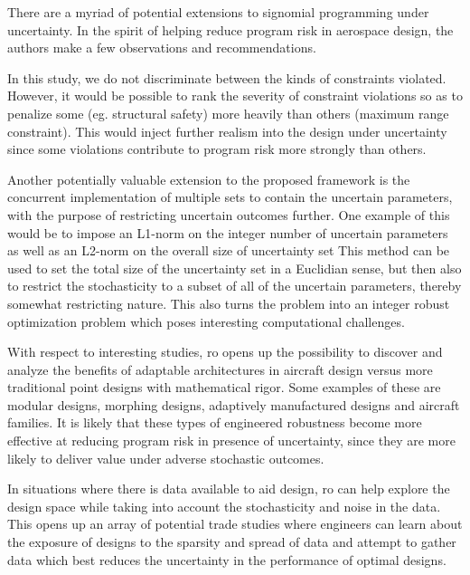 There are a myriad of potential extensions to signomial programming under uncertainty.
In the spirit of helping reduce program risk in aerospace design,
the authors make a few observations and recommendations.

In this study, we do not discriminate between the kinds of constraints violated. However, it would
be possible to rank the severity of constraint violations so as to penalize some (eg. structural safety)
more heavily than others (maximum range constraint). This would inject further realism into the
design under uncertainty since some violations contribute to program risk more
strongly than others.

Another potentially valuable extension to the proposed framework is the concurrent implementation
of multiple sets to contain the uncertain parameters, with the purpose of restricting uncertain
outcomes further. One example of this would be to impose an  L1-norm on the integer number of uncertain parameters
as well as an L2-norm on the overall size of uncertainty set
This method can be used to set the total size of the uncertainty set in a Euclidian sense,
but then also to restrict the stochasticity to a subset of all of the uncertain parameters,
thereby somewhat restricting nature. This also turns the problem into an integer robust
optimization problem which poses interesting computational challenges.

With respect to interesting studies, \gls{ro} opens up the possibility to discover and analyze the benefits
of adaptable architectures in aircraft design versus more traditional point designs
with mathematical rigor. Some examples of these are modular designs, morphing designs,
adaptively manufactured designs and aircraft families. It is likely that these types of engineered
robustness become more effective at reducing program risk
in presence of uncertainty, since they are more likely
to deliver value under adverse stochastic outcomes.

In situations where there is data available to aid design, \gls{ro} can help explore
the design space while taking into account the stochasticity and noise in the data.
This opens up an array of potential trade studies where engineers can learn about
the exposure of designs to the sparsity and spread of data and attempt to gather
data which best reduces the uncertainty in the performance of optimal designs.

